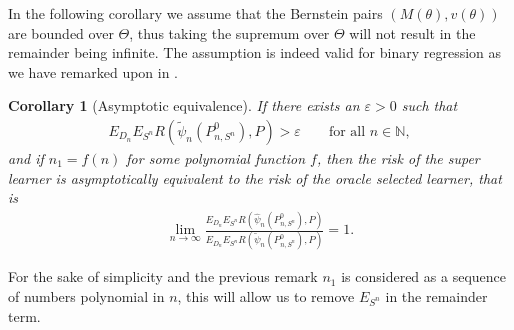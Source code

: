 \documentclass[11pt, a4paper]{article}
\newtheorem{corollary}[theorem]{Corollary}
\theoremstyle{definition}
\theoremstyle{remark}
\newcommand{\btheta}{\theta}
\newcommand{\la}{\psi}
\newcommand{\Sn}{S^n}
\begin{document}
In the following corollary we assume that the Bernstein pairs $ (M(\btheta), v(\btheta)) $ are bounded over $ \Theta $, thus taking the supremum over $ \Theta $ will not result in the remainder being infinite. The assumption is indeed valid for binary regression as we have remarked upon in . 
\begin{corollary}[Asymptotic equivalence] \label{cor:dslasymptoticequivalence}
    If there exists an $ \varepsilon > 0 $ such that 
   \begin{align*}
       E_{D_n} E_{\Sn} R(\tilde{\la}_n(P_{n, \Sn}^{0}), P) > \varepsilon \qquad \text{for all } n \in \mathbb{N},
   \end{align*}
   and if $ n_1 = f(n) $ for some polynomial function $ f $, then the risk of the super learner is asymptotically equivalent to the risk of the oracle selected learner, that is
   \begin{align*}
       \lim_{n \to \infty} \frac{E_{D_n} E_{\Sn} R(\hat{\la}_n(P_{n, \Sn}^{0}), P)}{E_{D_n} E_{\Sn} R(\tilde{\la}_n(P_{n, \Sn}^{0}), P)} = 1.
   \end{align*}
\end{corollary}
For the sake of simplicity and the previous remark $ n_1 $ is considered as a sequence of numbers polynomial in $ n $, this will allow us to remove $ E_{\Sn} $ in the remainder term. 
\end{document}
